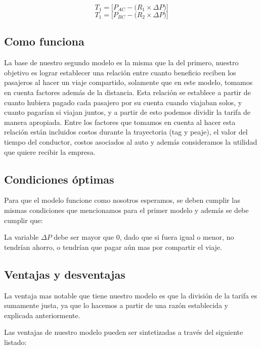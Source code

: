 \documentclass[12pt]{report}
\begin{document}
$$T_{1}=\Big[ P_{AC}-\Big(R_{1}\times \Delta P\Big) \Big]$$
$$T_{1}=\Big[ P_{BC}-\Big(R_{2}\times \Delta P \Big) \Big]$$

\subsection*{Como funciona}
La base de nuestro segundo modelo es la misma que la del primero, nuestro objetivo es lograr establecer una relación entre cuanto beneficio reciben los pasajeros al hacer un viaje compartido, solamente que en este modelo, tomamos en cuenta factores además de la distancia. Esta relación se establece a partir de cuanto hubiera pagado cada pasajero por su cuenta cuando viajaban solos, y cuanto pagarían si viajan juntos, y a partir de esto podemos dividir la tarifa de manera apropiada. Entre los factores que tomamos en cuenta al hacer esta relación están incluidos costos durante la trayectoria (tag y peaje), el valor del tiempo del conductor, costos asociados al auto y además consideramos la utilidad que quiere recibir la empresa.

\subsection*{Condiciones óptimas}
Para que el modelo funcione como nosotros esperamos, se deben cumplir las mismas condiciones que mencionamos para el primer modelo y además se debe cumplir que:

\begin{center}
    \item La variable $\Delta P$ debe ser mayor que 0, dado que si fuera igual o menor, no tendrían ahorro, o tendrían que pagar aún mas por compartir el viaje.
\end{center}

\subsection*{Ventajas y desventajas}
La ventaja mas notable que tiene nuestro modelo es que la división de la tarifa es sumamente justa, ya que lo hacemos a partir de una razón establecida y explicada anteriormente. 

Las ventajas de nuestro modelo pueden ser sintetizadas a través del siguiente listado:
\end{document}
